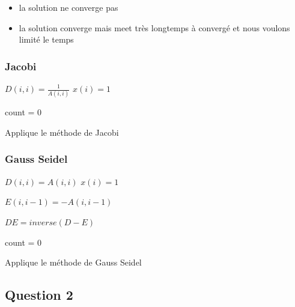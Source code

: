 \documentclass[11pt]{article}
\DeclarePairedDelimiter{\norm}{\lVert}{\rVert}
\begin{document}
\begin{itemize}
\item la solution ne converge pas
\item la solution converge mais meet très longtemps à convergé et nous
  voulons limité le temps
\end{itemize}

\subsubsection{Jacobi}

\begin{algorithm} [H]
  \SetAlgoLined
  
   {
    $D(i,i) = \frac{1}{A(i, i)}$\;
    $x(i) = 1$\;
  }

  count = 0\;


  \caption{Applique le méthode de Jacobi}
\end{algorithm}

\subsubsection{Gauss Seidel}

\begin{algorithm} [H]
  \SetAlgoLined
  
   {
    $D(i,i) = A(i, i)$\;
    $x(i) = 1$\;
  }

   {
    $E(i,i - 1) = - A(i, i - 1)$\;
  }

  $DE = inverse(D - E)$\;

  count = 0\;


  \caption{Applique le méthode de Gauss Seidel}
\end{algorithm}

\subsection{Question 2}
\end{document}
